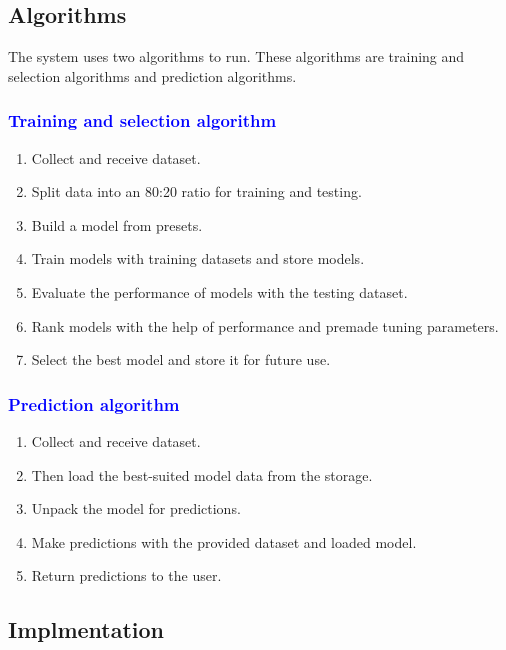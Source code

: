 \documentclass[a4paper,fleqn]{cas-dc}
\newcommand{\responsemodsm}[1]{\textcolor{blue}{#1}}
\newcommand{\subsubsectionb}[1]{\subsubsection{\responsemodsm{#1}}}
\begin{document}
\subsection{Algorithms}\label{subsec:algorithms}

The system uses two algorithms to run. These algorithms are training and selection algorithms and prediction algorithms.

\vspace{-0.5em}

\subsubsectionb{Training and selection algorithm}\label{subsubsec:training_and_selection_algorithm}
\vspace{0.5em}
\begin{enumerate}
    \item Collect and receive dataset.
    \item Split data into an 80:20 ratio for training and testing.
    \item Build a model from presets.
    \item Train models with training datasets and store models.
    \item Evaluate the performance of models with the testing dataset.
    \item Rank models with the help of performance and premade tuning parameters.
    \item Select the best model and store it for future use.
\end{enumerate}

\vspace{-0.5em}

\subsubsectionb{Prediction algorithm}\label{subsubsec:prediction_algorithm}
\vspace{0.5em}
\begin{enumerate}
    \item Collect and receive dataset.
    \item Then load the best-suited model data from the storage.
    \item Unpack the model for predictions.
    \item Make predictions with the provided dataset and loaded model.
    \item Return predictions to the user.
\end{enumerate}

\subsection{Implmentation}\label{subsec:implmentation}
\end{document}
